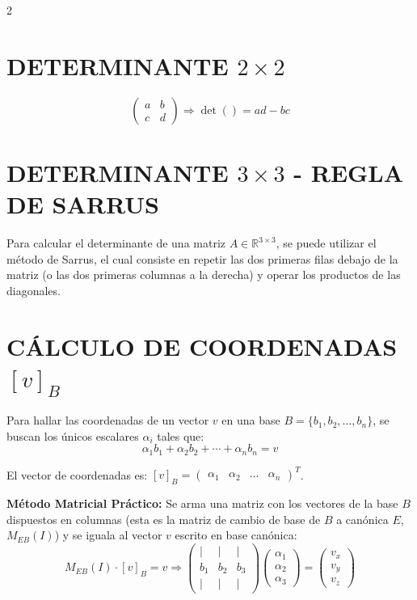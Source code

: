 \documentclass[10pt]{extarticle}
\newenvironment{term}
  {\begin{minipage}{\linewidth}}
  {\end{minipage}\par}
\begin{document}
\begin{multicols}{2}
\begin{term}
\section*{DETERMINANTE $2\times 2$}
$$\begin{pmatrix}a & b\\ c & d\end{pmatrix} \Rightarrow \det() = ad-bc$$
\end{term}

\begin{term}
\section*{DETERMINANTE $3\times 3$ - REGLA DE SARRUS}
Para calcular el determinante de una matriz $A \in \mathbb{R}^{3\times3}$, se puede utilizar el método de Sarrus, el cual consiste en repetir las dos primeras filas debajo de la matriz (o las dos primeras columnas a la derecha) y operar los productos de las diagonales.
\end{term}



\begin{term}
\section*{CÁLCULO DE COORDENADAS $[v]_B$}
Para hallar las coordenadas de un vector $v$ en una base $B = \{b_1,b_2,\ldots,b_n\}$, se buscan los únicos escalares $\alpha_i$ tales que:
$$\alpha_1b_1 + \alpha_2b_2 + \cdots + \alpha_nb_n = v$$

El vector de coordenadas es: $[v]_B = \begin{pmatrix}\alpha_1 & \alpha_2 & \ldots & \alpha_n\end{pmatrix}^T$.

\textbf{Método Matricial Práctico:} Se arma una matriz con los vectores de la base $B$ dispuestos en columnas (esta es la matriz de cambio de base de $B$ a canónica $E$, $M_{EB}(I)$) y se iguala al vector $v$ escrito en base canónica:
$$M_{EB}(I)\cdot[v]_B = v \Rightarrow \begin{pmatrix}| & | & |\\ b_1 & b_2 & b_3\\ | & | & |\end{pmatrix}\begin{pmatrix}\alpha_1\\\alpha_2\\\alpha_3\end{pmatrix} = \begin{pmatrix}v_x\\v_y\\v_z\end{pmatrix}$$
\end{term}


\end{multicols}
\end{document}
